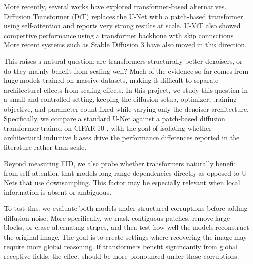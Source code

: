 \documentclass{article}
\begin{document}
More recently, several works have explored transformer-based alternatives. 
Diffusion Transformer (DiT) \citep{peebles2023dit} replaces the U-Net with a patch-based transformer using self-attention and reports very strong results at scale. 
U-ViT \citep{bao2023uvit} also showed compettive performance using a transformer backbone with skip connections. 
More recent systems such as Stable Diffusion 3 \citep{esser2024sd3} have also moved in this direction. 


This raises a natural question: are transformers structurally better denoisers, or do they mainly benefit from scaling well?
Much of the evidence so far comes from huge models trained on massive datasets, making it difficult to separate architectural effects from scaling effects. In this project, we study this question in a small and controlled setting, keeping the diffusion setup, optimizer, training objective, and parameter count fixed while varying only the denoiser architecture. Specifically, we compare a standard U-Net against a patch-based diffusion transformer trained on CIFAR-10 \citep{krizhevsky2009cifar}, with the goal of isolating whether architectural inductive biases drive the performance differences reported in the literature rather than scale.


Beyond measuring FID, we also probe whether transformers naturally benefit from self-attention that models long-range dependencies directly as opposed to U-Nets that use downsampling. This factor may be especially relevant when local information is absent or ambiguous.  



To test this, we evaluate both models under structured corruptions before adding diffusion noise. 
More specifically, we mask contiguous patches, remove large blocks, or erase alternating stripes, and then test how well the models reconstruct the original image.
The goal is to create settings where recovering the image may require more global reasoning. If transformers benefit significantly from global receptive fields, the effect should be more pronounced under these corruptions.
\end{document}
